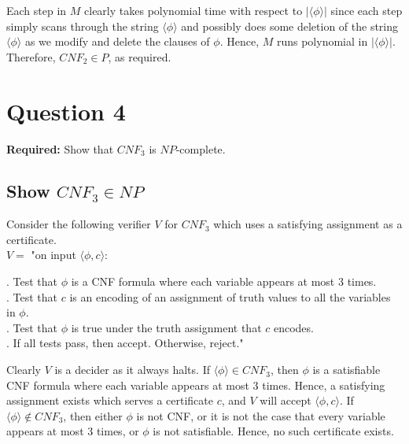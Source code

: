 \documentclass[12pt]{article}
\begin{document}
Each step in $M$ clearly takes polynomial time with respect to $|\langle \phi \rangle|$ since each step simply scans through the string $\langle \phi \rangle$ and possibly does some deletion of the string $\langle \phi \rangle$ as we modify and delete the clauses of $\phi$. Hence, $M$ runs polynomial in $|\langle \phi \rangle|$. \\

Therefore, $CNF_2 \in P$, as required. 

\newpage

\section*{Question 4}

\textbf{Required:} Show that $CNF_3$ is $NP$-complete. 

\subsection*{Show $CNF_3 \in NP$}

Consider the following verifier $V$ for $CNF_3$ which uses a satisfying assignment as a certificate. \\

$V = $ "on input $\langle \phi, c \rangle$: \\

\setlength\parindent{15pt}

. Test that $\phi$ is a CNF formula where each variable appears at most 3 times. \\
. Test that $c$ is an encoding of an assignment of truth values to all the variables in $\phi$. \\
. Test that $\phi$ is true under the truth assignment that $c$ encodes. \\
. If all tests pass, then accept. Otherwise, reject." \\
\setlength\parindent{0pt}

Clearly $V$ is a decider as it always halts. If $\langle \phi \rangle \in CNF_3$, then $\phi$ is a satisfiable CNF formula where each variable appears at most 3 times. Hence, a satisfying assignment exists which serves a certificate $c$, and $V$ will accept $\langle \phi, c \rangle$. If $\langle \phi \rangle \not \in CNF_3$, then either $\phi$ is not CNF, or it is not the case that every variable appears at most 3 times, or $\phi$ is not satisfiable. Hence, no such certificate exists. \\
\end{document}
